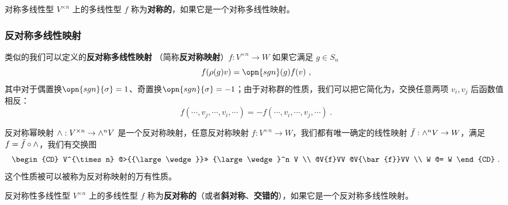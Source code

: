 \begin{definition}{对称多线性型}
$V^{\times n}$ 上的多线性型 $f$ 称为\textbf{对称的}，如果它是一个对称多线性映射。
%
\end{definition}

\subsubsection{反对称多线性映射}

类似的我们可以定义的\textbf{反对称多线性映射} （简称\textbf{反对称映射}）$f: V^{\times n} \to W$ 如果它满足 $g \in S_n$
\begin{equation}
f(\rho(g) v) = \opn{sgn}(g) f(v)~,
\end{equation}
其中对于偶置换$\opn{sgn}{\sigma} = 1$、奇置换$\opn{sgn}{\sigma} = -1$；由于对称群的性质，我们可以把它简化为，交换任意两项 $v_i, v_j$ 后函数值相反：
\begin{equation}
f(\cdots, v_j, \cdots, v_i, \cdots) = - f(\cdots, v_i, \cdots, v_j, \cdots)~.
\end{equation}

反对称幂映射 ${\large \wedge}: V^{\times n} \to {\large \wedge}^n V$ 是一个反对称映射，任意反对称映射 $f: V^{\times n} \to W$，我们都有唯一确定的线性映射 $\bar{f}: {\large \wedge}^n V \to W$，满足 $f = \bar{f} \circ {\large \wedge}$，我们有交换图
\begin{equation}
\begin{CD}
V^{\times n} @>{{\large \wedge}}>> {\large \wedge}^n V \\
@V{f}VV @V{\bar{f}}VV \\
W @= W
\end{CD}~.
\end{equation}
这个性质被可以被称为反对称映射的万有性质。

\begin{definition}{反对称性多线性型}\label{def_MulMap_1}
$V^{\times n}$ 上的多线性型 $f$ 称为\textbf{反对称的}（或者\textbf{斜对称}、\textbf{交错的}），如果它是一个反对称多线性映射。
\end{definition}
